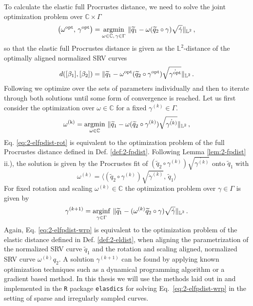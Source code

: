 \noindent To calculate the elastic full Procrustes distance, we need to solve the joint optimization problem over $\mathbb{C} \times \Gamma$
\begin{equation}
  \label{eq:2-elfpdist-opt}
  \left(\omega^\text{opt},\, \gamma^\text{opt} \right) = \operatorname*{argmin}_{\omega \in \mathbb{C},\, \gamma \in \Gamma} \,\, \lVert\widetilde q_1 - \omega (\widetilde q_2 \circ \gamma) \sqrt{\dot\gamma}\rVert_{\mathbb{L}^2}\,,
\end{equation}
so that the elastic full Procrustes distance is given as the $\mathbb{L}^2$-distance of the optimally aligned normalized SRV curves
\begin{equation}
  d([\beta_1], [\beta_2]) = \lVert\widetilde q_1 - \omega^\text{opt} ( \widetilde q_2 \circ \gamma^\text{opt}) \sqrt{\dot{\gamma^\text{opt}}}\rVert_{\mathbb{L}^2}\,.
\end{equation}
Following \cite{SrivastavaEtAl2011} we optimize over the sets of parameters individually and then to iterate through both solutions until some form of convergence is reached.
Let us first consider the optimization over $\omega \in \mathbb{C}$ for a fixed $\gamma^{(k)} \in \Gamma$.
\begin{equation}
  \label{eq:2-elfpdist-rot}
  \omega^\text{(k)}= \operatorname*{argmin}_{\omega \in \mathbb{C}}\,\, \lVert\widetilde q_1 - \omega (\widetilde q_2 \circ \gamma^{(k)}) \sqrt{\dot{\gamma^{(k)}}}\rVert_{\mathbb{L}^2}\,,
\end{equation}
Eq. \ref{eq:2-elfpdist-rot} is equivalent to the optimization problem of the full Procrustes distance defined in Def. \ref{def:2-fpdist}.
Following Lemma \ref{lem:2-fpdist} ii.), the solution is given by the Procrustes fit of $(\widetilde q_2 \circ \gamma^{(k)}) \sqrt{\dot{\gamma^{(k)}}}$ onto $\widetilde q_1$ with 
\begin{equation}
  \label{eq:2-elfpdist-rot-opt}
  \omega^{(k)} =\langle (\widetilde q_2 \circ \gamma^{(k)}) \sqrt{\dot\gamma^{(k)}},\, \widetilde q_1 \rangle
\end{equation}
For fixed rotation and scaling $\omega^{(k)} \in \mathbb{C}$ the optimization problem over $\gamma \in \Gamma$ is given by 
\begin{equation}
  \label{eq:2-elfpdist-wrp}
  \gamma^{(k+1)} = \operatorname*{arginf}_{\gamma \in \Gamma}\,\, \lVert\widetilde q_1 - (\omega^{(k)} \widetilde q_2 \circ \gamma) \sqrt{\dot\gamma}\rVert_{\mathbb{L}^2}\,.
\end{equation}
Again, Eq. \ref{eq:2-elfpdist-wrp} is equivalent to the optimization problem of the elastic distance defined in Def. \ref{def:2-eldist}, when aligning the parametrization of the normalized SRV curve $\widetilde q_1$ and the rotation and scaling aligned, normalized SRV curve $\omega^{(k)} q_2$.
A solution $\gamma^{(k+1)}$ can be found by applying known optimization techniques such as a dynamical programming algorithm or a gradient based method.
In this thesis we will use the methods laid out in \cite{Steyer2021} and implemented in the \texttt{R} package \texttt{elasdics} \parencite{elasdics} for solving Eq.\ \ref{eq:2-elfpdist-wrp} in the setting of sparse and irregularly sampled curves.

